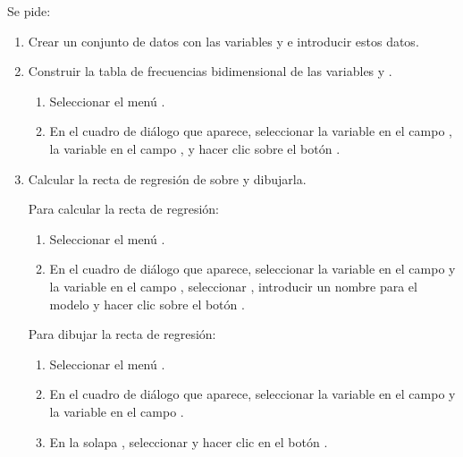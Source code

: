 \begin{enumerate}[leftmargin=*]
Se pide:
\begin{enumerate}
\item  Crear un conjunto de datos con las variables  y  e introducir estos
datos.

\item Construir la tabla de frecuencias bidimensional de las variables  y . 
\begin{indicacion}{
\begin{enumerate}
\item Seleccionar el menú .
\item En el cuadro de diálogo que aparece, seleccionar la variable  en el campo , la variable  en el campo , y hacer clic
sobre el botón . 
\end{enumerate}}
\end{indicacion}

\item  Calcular la recta de regresión de  sobre  y dibujarla.
\begin{indicacion}{
Para calcular la recta de regresión:
\begin{enumerate}
\item Seleccionar el menú .
\item En el cuadro de diálogo que aparece, seleccionar la variable  en el campo  y la variable  en el campo , seleccionar
, introducir un nombre para el modelo y hacer clic sobre el botón .
\end{enumerate}
Para dibujar la recta de regresión:
\begin{enumerate}
\item Seleccionar el menú .
\item En el cuadro de diálogo que aparece, seleccionar la variable  en el campo  y
la variable  en el campo .
\item En la solapa , seleccionar  y hacer clic en el botón
.
\end{enumerate}}
\end{indicacion}


\end{enumerate}
\end{enumerate}
